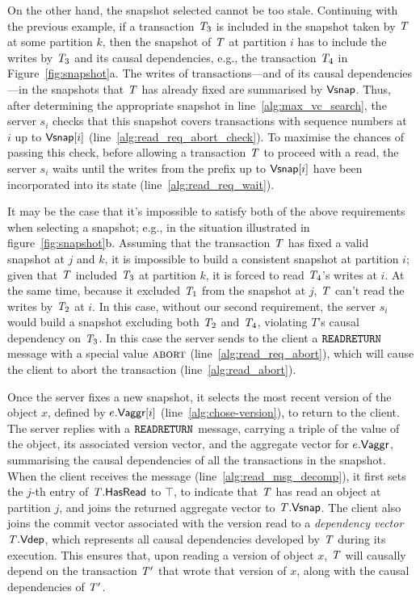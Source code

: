 On the other hand, the snapshot selected cannot be too stale. Continuing with the previous example, if a transaction $\mathit{T}_3$ is included in the snapshot taken by $\mathit{T}$ at some partition $k$, then the snapshot of $\mathit{T}$ at partition $i$ has to include the writes by $\mathit{T}_3$ and its causal dependencies, e.g., the transaction $\mathit{T}_4$ in Figure~\ref{fig:snapshot}a. The writes of transactions---and of its causal dependencies---in the snapshots that $\mathit{T}$ has already fixed are summarised by $\mathsf{Vsnap}$. Thus, after determining the appropriate snapshot in line~\ref{alg:max_vc_search}, the server $s_i$ checks that this snapshot covers transactions with sequence numbers at $i$ up to $\mathsf{Vsnap}[i]$ (line~\ref{alg:read_req_abort_check}). To maximise the chances of passing this check, before allowing a transaction $\mathit{T}$ to proceed with a read, the server $s_i$ waits until the writes from the prefix up to $\mathsf{Vsnap}[i]$ have been incorporated into its state (line~\ref{alg:read_req_wait}).

It may be the case that it's impossible to satisfy both of the above requirements when selecting a snapshot; e.g., in the situation illustrated in figure~\ref{fig:snapshot}b. Assuming that the transaction $\mathit{T}$ has fixed a valid snapshot at $j$ and $k$, it is impossible to build a consistent snapshot at partition $i$; given that $\mathit{T}$ included $\mathit{T}_3$ at partition $k$, it is forced to read $\mathit{T}_4$'s writes at $i$. At the same time, because it excluded $\mathit{T}_1$ from the snapshot at $j$, $\mathit{T}$ can't read the writes by $\mathit{T}_2$ at $i$. In this case, without our second requirement, the server $s_i$ would build a snapshot excluding both $\mathit{T}_2$ and $\mathit{T}_4$, violating $T$'s causal dependency on $\mathit{T}_3$. In this case the server sends to the client a ${\tt READRETURN}$ message with a special value $\text{\sc abort}$ (line~\ref{alg:read_req_abort}), which will cause the client to abort the transaction (line~\ref{alg:read_abort}).

Once the server fixes a new snapshot, it selects the most recent version of the object $x$, defined by $e.\mathsf{Vaggr}[i]$ (line~\ref{alg:chose-version}), to return to the client. The server replies with a ${\tt READRETURN}$ message, carrying a triple of the value of the object, its associated version vector, and the aggregate vector for $e.\mathsf{Vaggr}$, summarising the causal dependencies of all the transactions in the snapshot. When the client receives the message (line~\ref{alg:read_msg_decomp}), it first sets the $j$-th entry of $\mathit{T}.\mathsf{HasRead}$ to $\top$, to indicate that $\mathit{T}$ has read an object at partition $j$, and joins the returned aggregate vector to $\mathit{T}.\mathsf{Vsnap}$. The client also joins the commit vector associated with the version read to a \emph{dependency vector} $\mathit{T}.\mathsf{Vdep}$, which represents all causal dependencies developed by $\mathit{T}$ during its execution. This ensures that, upon reading a version of object $x$, $\mathit{T}$ will causally depend on the transaction $\mathit{T}'$ that wrote that version of $x$, along with the causal dependencies of $\mathit{T}'$.

